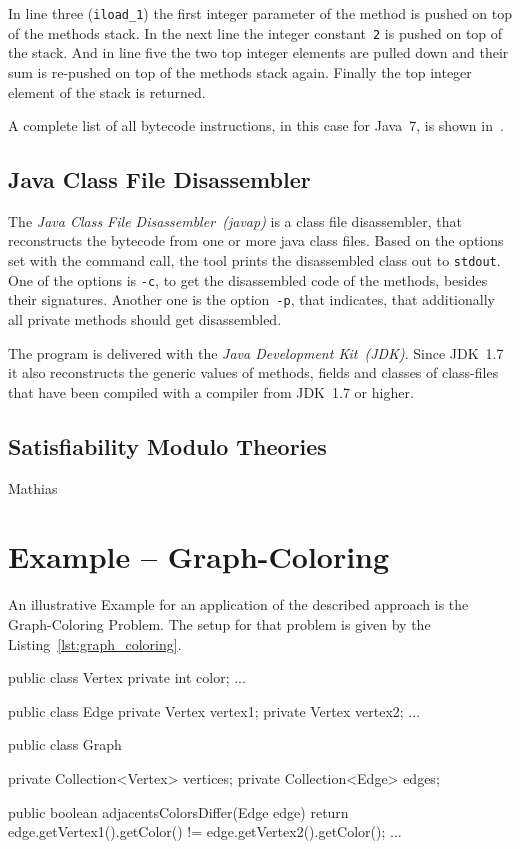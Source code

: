 \documentclass[conference]{IEEEtran}
\begin{document}
In line three (\texttt{iload\_1}) the first integer parameter of the method is
pushed on top of the methods stack. In the next line the integer
constant~\texttt{2} is pushed on top of the stack. And in line five the two top
integer elements are pulled down and their sum is re-pushed on top of the
methods stack again. Finally the top integer element of the stack is returned.

A complete list of all bytecode instructions, in this case for Java~7, is shown
in~\cite{LindholmYBB11}.

\subsection{Java Class File Disassembler}
\label{sec:prelim_javap}

The \emph{Java Class File Disassembler~(javap)} is a class file disassembler,
that reconstructs the bytecode from one or more java class files. Based on the
options set with the command call, the tool prints the disassembled class out
to \texttt{stdout}. One of the options is \texttt{-c}, to get the disassembled
code of the methods, besides their signatures. Another one is the
option~\texttt{-p}, that indicates, that additionally all private methods
should get disassembled.

The program is delivered with the \emph{Java Development Kit~(JDK)}. Since
JDK~1.7 it also reconstructs the generic values of methods, fields and classes
of class-files that have been compiled with a compiler from JDK~1.7 or higher.

\subsection{Satisfiability Modulo Theories}
\label{sec:prelim_smt}

\danger Mathias

\section{Example -- Graph-Coloring}
\label{sec:example}

An illustrative Example for an application of the described approach is the
Graph-Coloring Problem. The setup for that problem is given by the
Listing~\ref{lst:graph_coloring}.

\begin{javalisting}[label=lst:graph_coloring,caption=Example]
public class Vertex {
  private int color;
  ...
}

public class Edge {
  private Vertex vertex1;
  private Vertex vertex2;
  ...
}

public class Graph {
  private Collection<Vertex> vertices;
  private Collection<Edge> edges;

  public boolean adjacentsColorsDiffer(Edge edge) {
    return edge.getVertex1().getColor() != edge.getVertex2().getColor();
  }
  ...
}
\end{javalisting}
\end{document}
